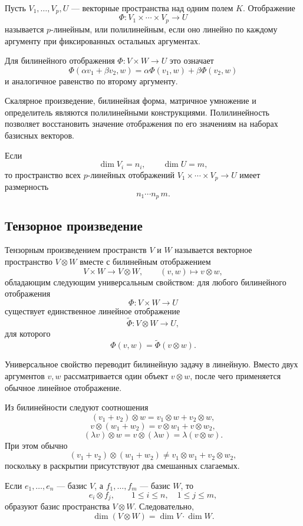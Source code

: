 \begin{definition}
Пусть \(V_1,\dots,V_p,U\) --- векторные пространства над одним полем \(K\). Отображение
\[
\Phi:V_1\times\cdots\times V_p\to U
\]
называется \(p\)-линейным, или полилинейным, если оно линейно по каждому аргументу при фиксированных остальных аргументах.
\end{definition}

Для билинейного отображения \(\Phi:V\times W\to U\) это означает
\[
\Phi(\alpha v_1+\beta v_2,w)
=
\alpha\Phi(v_1,w)+\beta\Phi(v_2,w)
\]
и аналогичное равенство по второму аргументу.

Скалярное произведение, билинейная форма, матричное умножение и определитель являются полилинейными конструкциями. Полилинейность позволяет восстановить значение отображения по его значениям на наборах базисных векторов.

Если
\[
\dim V_i=n_i,
\qquad
\dim U=m,
\]
то пространство всех \(p\)-линейных отображений \(V_1\times\cdots\times V_p\to U\) имеет размерность
\[
n_1\cdots n_p\,m.
\]

\subsection{Тензорное произведение}

\begin{definition}
Тензорным произведением пространств \(V\) и \(W\) называется векторное пространство \(V\otimes W\) вместе с билинейным отображением
\[
V\times W\to V\otimes W,
\qquad
(v,w)\mapsto v\otimes w,
\]
обладающим следующим универсальным свойством: для любого билинейного отображения
\[
\Phi:V\times W\to U
\]
существует единственное линейное отображение
\[
\widetilde{\Phi}:V\otimes W\to U,
\]
для которого
\[
\Phi(v,w)=\widetilde{\Phi}(v\otimes w).
\]
\end{definition}

Универсальное свойство переводит билинейную задачу в линейную. Вместо двух аргументов \(v,w\) рассматривается один объект \(v\otimes w\), после чего применяется обычное линейное отображение.

Из билинейности следуют соотношения
\[
(v_1+v_2)\otimes w
=
v_1\otimes w+v_2\otimes w,
\]
\[
v\otimes(w_1+w_2)
=
v\otimes w_1+v\otimes w_2,
\]
\[
(\lambda v)\otimes w
=
v\otimes(\lambda w)
=
\lambda(v\otimes w).
\]
При этом обычно
\[
(v_1+v_2)\otimes(w_1+w_2)
\neq
v_1\otimes w_1+v_2\otimes w_2,
\]
поскольку в раскрытии присутствуют два смешанных слагаемых.

\begin{theorem}
Если \(e_1,\dots,e_n\) --- базис \(V\), а \(f_1,\dots,f_m\) --- базис \(W\), то
\[
e_i\otimes f_j,
\qquad
1\leq i\leq n,\quad 1\leq j\leq m,
\]
образуют базис пространства \(V\otimes W\). Следовательно,
\[
\dim(V\otimes W)=\dim V\cdot\dim W.
\]
\end{theorem}

